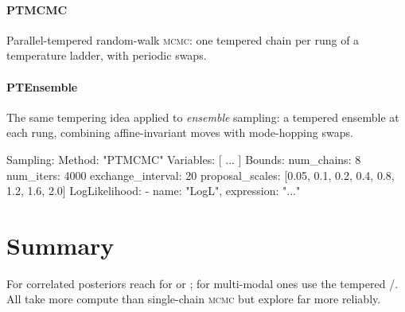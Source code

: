 \paragraph{PTMCMC} Parallel-tempered random-walk \textsc{mcmc}: one tempered chain per rung of a
temperature ladder, with periodic swaps.

\paragraph{PTEnsemble} The same tempering idea applied to \emph{ensemble} sampling: a tempered
ensemble at each rung, combining affine-invariant moves with mode-hopping swaps.

\begin{yamlwin}
Sampling:
  Method: "PTMCMC"
  Variables: [ ... ]
  Bounds:
    num_chains: 8
    num_iters: 4000
    exchange_interval: 20
    proposal_scales: [0.05, 0.1, 0.2, 0.4, 0.8, 1.2, 1.6, 2.0]
  LogLikelihood:
    - {name: "LogL", expression: "..."}
\end{yamlwin}

\section{Summary}
\label{sec:mcmc2-summary}

For correlated posteriors reach for  or ; for multi-modal ones
use the tempered /. All take more compute than single-chain
\textsc{mcmc} but explore far more reliably.
